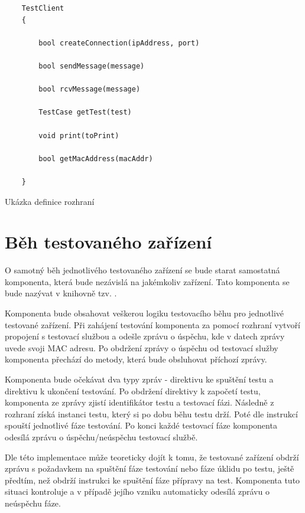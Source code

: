\begin{listing}[htbp]
    \begin{verbatim}
    TestClient 
    {

        bool createConnection(ipAddress, port)

        bool sendMessage(message)

        bool rcvMessage(message)

        TestCase getTest(test)

        void print(toPrint)

        bool getMacAddress(macAddr)
    
    }
    \end{verbatim}
\caption{Ukázka definice rozhraní}
\label{listing:dev_if_abstract}
\end{listing}

\section{Běh testovaného zařízení}

O samotný běh jednotlivého testovaného zařízení se bude starat samostatná komponenta, která bude nezávislá na jakémkoliv zařízení. Tato komponenta se bude nazývat v knihovně tzv. .

Komponenta bude obsahovat veškerou logiku testovacího běhu pro jednotlivé testované zařízení. Při zahájení testování komponenta za pomocí rozhraní vytvoří propojení s testovací službou a odešle zprávu o úspěchu, kde v datech zprávy uvede svoji MAC adresu. Po obdržení zprávy o úspěchu od testovací služby komponenta přechází do metody, která bude obsluhovat příchozí zprávy. 

Komponenta bude očekávat dva typy zpráv - direktivu ke spuštění testu a direktivu k ukončení testování. Po obdržení direktivy k započetí testu, komponenta ze zprávy zjistí identifikátor testu a testovací fázi. Následně z rozhraní získá instanci testu, který si po dobu běhu testu drží. Poté dle instrukcí spouští jednotlivé fáze testování. Po konci každé testovací fáze komponenta odesílá zprávu o úspěchu/neúspěchu testovací službě.

Dle této implementace může teoreticky dojít k tomu, že testované zařízení obdrží zprávu s požadavkem na spuštění fáze testování nebo fáze úklidu po testu, ještě předtím, než obdrží instrukci ke spuštění fáze přípravy na test. Komponenta tuto situaci kontroluje a v případě jejího vzniku automaticky odesílá zprávu o neúspěchu fáze. 

